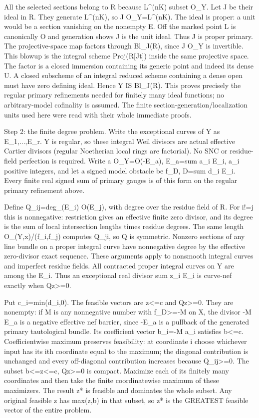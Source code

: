 All the selected sections belong to R because L\textasciicircum{}(nK) subset O\_Y. Let J be their ideal in R. They generate L\textasciicircum{}(nK), so J O\_Y=L\textasciicircum{}(nK). The ideal is proper: a unit would be a section vanishing on the nonempty E. Off the marked point L is canonically O and generation shows J is the unit ideal. Thus J is proper primary. The projective-space map factors through Bl\_J(R), since J O\_Y is invertible. This blowup is the integral scheme Proj(R[Jt]) inside the same projective space. The factor is a closed immersion containing its generic point and indeed its dense U. A closed subscheme of an integral reduced scheme containing a dense open must have zero defining ideal. Hence Y IS Bl\_J(R). This proves precisely the regular primary refinements needed for finitely many ideal functions; no arbitrary-model cofinality is assumed. The finite section-generation/localization units used here were read with their whole immediate proofs.

Step 2: the finite degree problem. Write the exceptional curves of Y as E\_1,...,E\_r. Y is regular, so these integral Weil divisors are actual effective Cartier divisors (regular Noetherian local rings are factorial). No SNC or residue-field perfection is required. Write a O\_Y=O(-E\_a), E\_a=sum a\_i E\_i, a\_i positive integers, and let a signed model obstacle be f\_D, D=sum d\_i E\_i. Every finite real signed sum of primary gauges is of this form on the regular primary refinement above.

Define Q\_ij=deg\_(E\_i) O(E\_j), with degree over the residue field of R. For i!=j this is nonnegative: restriction gives an effective finite zero divisor, and its degree is the sum of local intersection lengths times residue degrees. The same length O\_(Y,x)/(f\_i,f\_j) computes Q\_ji, so Q is symmetric. Nonzero sections of any line bundle on a proper integral curve have nonnegative degree by the effective zero-divisor exact sequence. These arguments apply to nonsmooth integral curves and imperfect residue fields. All contracted proper integral curves on Y are among the E\_i. Thus an exceptional real divisor sum z\_i E\_i is curve-nef exactly when Qz>=0.

Put c\_i=min(d\_i,0). The feasible vectors are z<=c and Qz>=0. They are nonempty: if M is any nonnegative number with f\_D>=-M on X, the divisor -M E\_a is a negative effective nef barrier, since -E\_a is a pullback of the generated primary tautological bundle. Its coefficient vector b\_i=-M a\_i satisfies b<=c. Coefficientwise maximum preserves feasibility: at coordinate i choose whichever input has its ith coordinate equal to the maximum; the diagonal contribution is unchanged and every off-diagonal contribution increases because Q\_ij>=0. The subset b<=z<=c, Qz>=0 is compact. Maximize each of its finitely many coordinates and then take the finite coordinatewise maximum of these maximizers. The result z* is feasible and dominates the whole subset. Any original feasible z has max(z,b) in that subset, so z* is the GREATEST feasible vector of the entire problem.

